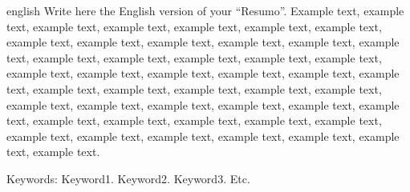 \documentclass[
	12pt,				%
	oneside,			%
	a4paper,			%
	english,			%
	brazil				%
	]{abntex2ppgsi}
\begin{document}
% 
% 
\begin{resumo}[Abstract]
\begin{otherlanguage*}{english}
Write here the English version of your ``Resumo''. Example text, example text, example text, example text, example text, example text, example text, example text, example text, example text, example text, example text, example text, example text, example text, example text, example text, example text, example text, example text, example text, example text, example text, example text, example text, example text, example text, example text, example text, example text, example text, example text, example text, example text, example text, example text, example text, example text, example text, example text, example text, example text, example text, example text, example text, example text, example text.

Keywords: Keyword1. Keyword2. Keyword3. Etc.
\end{otherlanguage*}
\end{resumo}

\listoffigures*
\cleardoublepage

\listofalgorithms
\cleardoublepage
\end{document}
